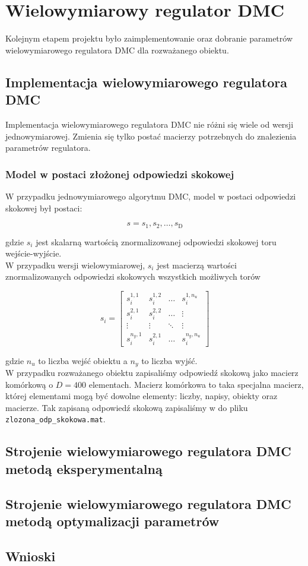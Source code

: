 \chapter{Wielowymiarowy regulator DMC}
\label{pro_dmc}

Kolejnym etapem projektu było zaimplementowanie oraz dobranie parametrów
wielowymiarowego regulatora DMC dla rozważanego obiektu.


\section{Implementacja wielowymiarowego regulatora DMC}
\label{pro_dmc_implementacja}
Implementacja wielowymiarowego regulatora DMC nie różni się wiele od wersji
jednowymiarowej. Zmienia się tylko postać macierzy potrzebnych do
znalezienia parametrów regulatora. 

\subsection{Model w postaci złożonej odpowiedzi skokowej}
\label{pro_dmc_impl_odp_skok}
W przypadku jednowymiarowego algorytmu DMC, model w postaci odpowiedzi skokowej
był postaci:

\begin{equation*}
    s = s_{\mathrm{1}}, s_{\mathrm{2}}, \hdots, s_{\mathrm{D}}
\end{equation*}

gdzie $s_{i}$ jest skalarną wartością znormalizowanej odpowiedzi skokowej toru
wejście-wyjście.\\

W przypadku wersji wielowymiarowej, $s_{i}$ jest macierzą wartości znormalizowanych
odpowiedzi skokowych wszystkich możliwych torów

\[
s_{i} =
\begin{bmatrix}
    s_{i}^{1,1} & s_{i}^{1,2} & \hdots & s_{i}^{1,n_{u}} \\
    s_{i}^{2,1} & s_{i}^{2,2} & \hdots & \vdots \\
    \vdots & \vdots & \ddots & \vdots \\
    s_{i}^{n_{y},1} & s_{i}^{2,1} & \hdots & s_{i}^{n_{y},n_{u}} 
\end{bmatrix}
\]

gdzie $n_{u}$ to liczba wejść obiektu a $n_{y}$ to liczba wyjść.\\

W przypadku rozważanego obiektu zapisaliśmy odpowiedź skokową jako 
macierz komórkową o $D = \num{400}$ elementach. Macierz komórkowa
to taka specjalna macierz, której elementami mogą być dowolne elementy:
liczby, napisy, obiekty oraz macierze. Tak zapisaną odpowiedź skokową zapisaliśmy
w do pliku \verb+zlozona_odp_skokowa.mat+.

\section{Strojenie wielowymiarowego regulatora DMC metodą eksperymentalną}
\label{pro_dmc_strojenie}


\section{Strojenie wielowymiarowego regulatora DMC metodą optymalizacji parametrów}
\label{pro_dmc_optymalizacja}


\section{Wnioski}
\label{pro_dmc_wnioski}
